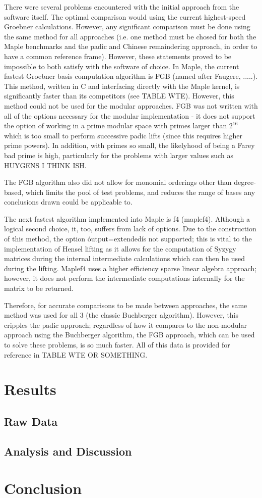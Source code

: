 \documentclass{article}
\begin{document}
\par There were several problems encountered with the initial approach from the software itself.  The optimal comparison would using the current highest-speed Groebner calculations.  However, any significant comparison must be done using the same method for all approaches (i.e. one method must be chosed for both the Maple benchmarks and the padic and Chinese remaindering approach, in order to have a common reference frame).  
However, these statements proved to be impossible to both satisfy with the software of choice.  In Maple, the current fastest Groebner basis computation algorithm is FGB (named after Faugere, .....).  This method, written in C and interfacing directly with the Maple kernel, is significantly faster than its competitors (see TABLE WTE).  However, this method could not be used for the modular approaches.  FGB was not written with all of the options necessary for the modular implementation - it does not support the option of working in a prime modular space with primes larger than $2^{16}$ which is too small to perform successive padic lifts (since this requires higher prime powers).  In addition, with primes so small, the likelyhood of being a Farey bad prime is high, particularly for the problems with larger values such as HUYGENS I THINK ISH.  
\par The FGB algorithm also did not allow for monomial orderings other than degree-based, which limits the pool of test problems, and reduces the range of bases any conclusions drawn could be applicable to.
\par The next fastest algorithm implemented into Maple is f4 (maplef4).  Although a logical second choice, it, too, suffers from lack of options.  Due to the construction of this method, the option \'output=extended\' is not supported; this is vital to the implementation of Hensel lifting as it allows for the computation of Syzygy matrices during the internal intermediate calculations which can then be used during the lifting.  Maplef4 uses a higher efficiency sparse linear algebra approach; however, it does not perform the intermediate computations internally for the matrix to be returned.
\par Therefore, for accurate comparisons to be made between approaches, the same method was used for all 3 (the classic Buchberger algorithm).  However, this cripples the padic approach; regardless of how it compares to the non-modular approach using the Buchberger algorithm, the FGB approach, which can be used to solve these problems, is so much faster.  All of this data is provided for reference in TABLE WTE OR SOMETHING.

\section{Results}
\subsection{Raw Data}
\subsection{Analysis and Discussion}

\section{Conclusion}


\begin{appendix}
  \listoffigures
\end{appendix}
\end{document}
